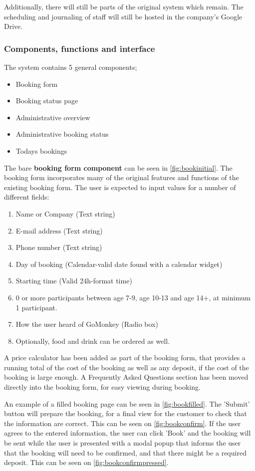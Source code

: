 Additionally, there will still be parts of the original system which remain. 
The scheduling and journaling of staff will still be hosted in the company's 
Google Drive. 

\subsubsection{Components, functions and interface}
The system contains 5 general components;
\begin{itemize}
\item Booking form
\item Booking status page
\item Administrative overview
\item Administrative booking status
\item Todays bookings
\end{itemize}

The bare \textbf{booking form component} can be seen in \autoref{fig:bookinitial}. The booking
form incorporates many of the original features and functions of the existing 
\gomonkey booking form. The user is expected to input values for a number of 
different fields:
\begin{enumerate}
	\item Name or Company (Text string)
	\item E-mail address (Text string)
	\item Phone number (Text string)
	\item Day of booking (Calendar-valid date found with a calendar widget)
	\item Starting time (Valid 24h-format time)
	\item 0 or more participants between age 7-9, age 10-13 and age 14+, at minimum 1 participant.
	\item How the user heard of GoMonkey (Radio box)
	\item Optionally, food and drink can be ordered as well.
\end{enumerate}

A price calculator has been added as part of the booking form, that provides 
a running total of the cost of the booking as well as any deposit, if the cost
of the booking is large enough. A Frequently Asked Questions section has been 
moved directly into the booking form, for easy viewing during booking.

An example of a filled booking page can be seen in \autoref{fig:bookfilled}. The
'Submit' button will prepare the booking, for a final view for the customer to 
check that the information are correct. This can be seen on 
\autoref{fig:bookconfirm}. If the user agrees to the entered information, the
user can click 'Book' and the booking will be sent while the user is presented
with a modal popup that informs the user that the booking will need to be confirmed,
and that there might be a required deposit. This can be seen on 
\autoref{fig:bookconfirmpressed}.


